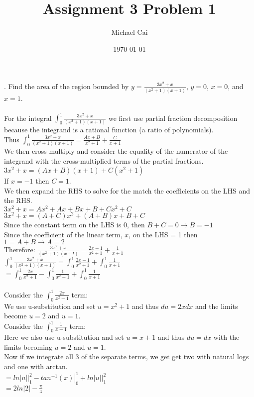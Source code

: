 \documentclass[11pt, oneside]{article}   	%
\title{Assignment 3 Problem 1}
\author{Michael Cai}
\date{\today}							%
\begin{document}
\maketitle

. Find the area of the region bounded by $y = \frac{3x^2+x}{(x^2+1)(x+1)}$, $y=0$, $x=0$, and $x=1$.\\~\\
For the integral $\int_0^1 \frac{3x^2+x}{(x^2+1)(x+1)}$ we first use partial fraction decomposition because the integrand is a rational function (a ratio of polynomials).\\
Thus $\int_0^1 \frac{3x^2+x}{(x^2+1)(x+1)} = \frac{Ax + B}{x^2+1} + \frac{C}{x+1}$\\
We then cross multiply and consider the equality of the numerator of the integrand with the cross-multiplied terms of the partial fractions.\\
$3x^2 + x = (Ax + B)(x+1) + C(x^2+1)$\\
If $x = -1$ then $C=1$.\\
We then expand the RHS to solve for the match the coefficients on the LHS and the RHS.\\
$3x^2 + x = Ax^2 + Ax + Bx + B + Cx^2 + C$\\
$3x^2 + x = (A+C)x^2 + (A+B)x + B+C$\\
Since the constant term on the LHS is 0, then $B+C = 0 \rightarrow B = -1$\\
Since the coefficient of the linear term, $x$, on the LHS = 1 then $1 = A+B \rightarrow A = 2$\\
Therefore: $\frac{3x^2+x}{(x^2+1)(x+!)} = \frac{2x-1}{x^2+1} + \frac{1}{x+1}$\\
$\int_0^1 \frac{3x^2+x}{(x^2+1)(x+1)} = \int_0^1 \frac{2x-1}{x^2+1} + \int_0^1 \frac{1}{x+1}$\\
$= \int_0^1 \frac{2x}{x^2+1} - \int_0^1 \frac{1}{x^2+1} + \int_0^1 \frac{1}{x+1}$\\~\\
Consider the $\int_0^1 \frac{2x}{x^2+1}$ term:\\
We use u-substitution and set $u= x^2 + 1$ and thus $du = 2xdx$ and the limits become $u = 2$ and $u = 1$.\\
Consider the $\int_0^1 \frac{1}{x+1}$ term:\\
Here we also use u-substitution and set $u = x+1$ and thus $du = dx$ with the limits becoming $u = 2$ and $u = 1$.\\
Now if we integrate all 3 of the separate terms, we get get two with natural logs and one with arctan.\\
$= \left. ln|u| \right|_1^2 - \left. tan^{-1}(x) \right|_0^1 + \left. ln|u| \right|_1^2$\\
$= 2ln|2| - \frac{\pi}{4}$
\end{document}
